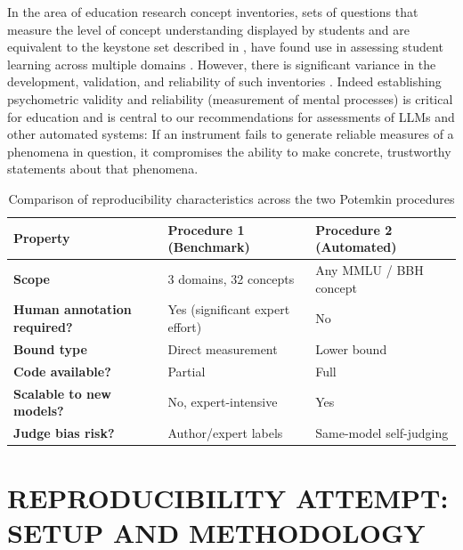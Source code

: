 \documentclass[sigconf,authordraft]{acmart}
\begin{document}
In the area of education research concept inventories, sets of questions that measure the level of concept understanding displayed by students and are equivalent to the keystone set described in \cite{mancoridis2025potemkin}, have found use in assessing student learning across multiple domains \citep{sands2018using}.  However, there is significant variance in the development, validation, and reliability of such inventories \cite{netere2024_stem_concept_inventories}.  Indeed establishing psychometric validity and reliability (measurement of mental processes) is critical for education and is central to our recommendations for assessments of LLMs and other automated systems: If an instrument fails to generate reliable measures of a phenomena in question, it compromises the ability to make concrete, trustworthy statements about that phenomena.

\begin{table}[t]
\small
\centering
\setlength{\tabcolsep}{4pt}
\renewcommand{\arraystretch}{1.15}


\begin{tabularx}{\columnwidth}{>{\bfseries}l X X}
\toprule
Property & Procedure 1 (Benchmark) & Procedure 2 (Automated) \\
\midrule
Scope & 3 domains, 32 concepts & Any MMLU / BBH concept \\
Human annotation required? & Yes (significant expert effort) & No \\
Bound type & Direct measurement & Lower bound \\
Code available? & Partial & Full \\
Scalable to new models? & No, expert-intensive & Yes \\
Judge bias risk? & Author/expert labels & Same-model self-judging \\
\bottomrule
\end{tabularx}

\caption{Comparison of reproducibility characteristics across the two Potemkin procedures}
\label{tab:potemkin-procedures}
\end{table}


\section{REPRODUCIBILITY ATTEMPT: SETUP AND METHODOLOGY}
\end{document}
